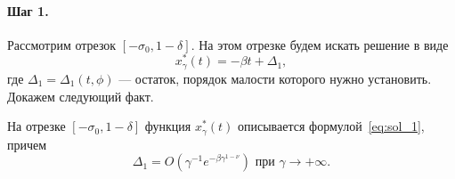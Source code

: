 \paragraph{Шаг 1.} Рассмотрим отрезок $[-\sigma_0, 1 - \delta]$. На этом отрезке будем искать решение в виде
%
\begin{equation}
	\label{eq:sol_1}
	x_\gamma^*(t) = -\beta t + \Delta_1,
\end{equation}
%
где $\Delta_1 = \Delta_1(t, \phi)$ --- остаток, порядок малости которого нужно установить. Докажем следующий факт.
%
\begin{lemma}
\label{lm:Delta1}
На отрезке $[-\sigma_0, 1 - \delta]$ функция $x_\gamma^*(t)$ описывается формулой~\eqref{eq:sol_1}, причем
%
\[
\Delta_1 = O\left(\gamma^{-1} e^{-\beta\gamma^{1 - \nu}}\right) \text{ при } \gamma \to +\infty.
\]
\end{lemma}
